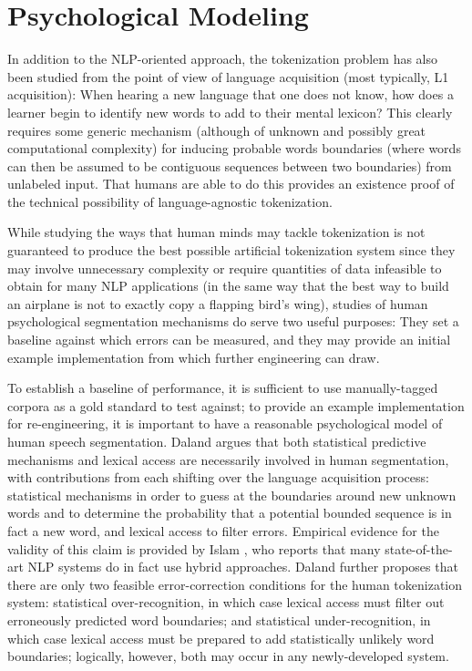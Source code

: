 \section{Psychological Modeling}

In addition to the NLP-oriented approach, the tokenization problem has also been studied from the point of view of language acquisition (most typically, L1 acquisition): When hearing a new language that one does not know, how does a learner begin to identify new words to add to their mental lexicon? This clearly requires some generic mechanism (although of unknown and possibly great computational complexity) for inducing probable words boundaries (where words can then be assumed to be contiguous sequences between two boundaries) from unlabeled input. That humans are able to do this provides an existence proof of the technical possibility of language-agnostic tokenization.

While studying the ways that human minds may tackle tokenization is not guaranteed to produce the best possible artificial tokenization system since they may involve unnecessary complexity or require quantities of data infeasible to obtain for many NLP applications (in the same way that the best way to build an airplane is not to exactly copy a flapping bird's wing), studies of human psychological segmentation mechanisms do serve two useful purposes: They set a baseline against which errors can be measured, and they may provide an initial example implementation from which further engineering can draw\cite{daland09}.

To establish a baseline of performance, it is sufficient to use manually-tagged corpora as a gold standard to test against; to provide an example implementation for re-engineering, it is important to have a reasonable psychological model of human speech segmentation. Daland\cite{daland09} argues that both statistical predictive mechanisms and lexical access are necessarily involved in human segmentation, with contributions from each shifting over the language acquisition process: statistical mechanisms in order to guess at the boundaries around new unknown words and to determine the probability that a potential bounded sequence is in fact a new word, and lexical access to filter errors. Empirical evidence for the validity of this claim is provided by Islam \cite{islam07}, who reports that many state-of-the-art NLP systems do in fact use hybrid approaches. Daland\cite{daland09} further proposes that there are only two feasible error-correction conditions for the human tokenization system: statistical over-recognition, in which case lexical access must filter out erroneously predicted word boundaries; and statistical under-recognition, in which case lexical access must be prepared to add statistically unlikely word boundaries; logically, however, both may occur in any newly-developed system.

